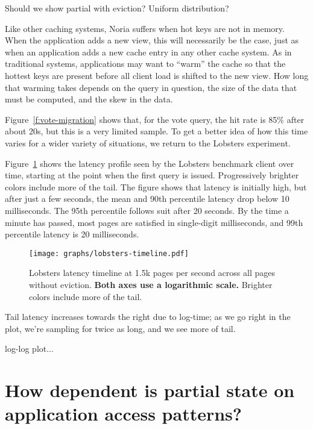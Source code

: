 \begin{inprogress}
  Should we show partial with eviction?
  Uniform distribution?
\end{inprogress}

Like other caching systems, Noria suffers when hot keys are not in memory. When
the application adds a new view, this will necessarily be the case, just as when
an application adds a new cache entry in any other cache system. As in
traditional systems, applications may want to ``warm'' the cache so that the
hottest keys are present before all client load is shifted to the new view. How
long that warming takes depends on the query in question, the size of the data
that must be computed, and the skew in the data.

Figure~\ref{f:vote-migration} shows that, for the vote query, the hit rate is
85\% after about 20s, but this is a very limited sample. To get a better idea of
how this time varies for a wider variety of situations, we return to the
Lobsters experiment.

Figure~\ref{f:lobsters-timeline} shows the latency profile seen by the Lobsters
benchmark client over time, starting at the point when the first query is
issued. Progressively brighter colors include more of the tail. The figure
shows that latency is initially high, but after just a few seconds, the mean and
90th percentile latency drop below 10 milliseconds. The 95th percentile follows
suit after 20 seconds. By the time a minute has passed, most pages are satisfied
in single-digit milliseconds, and 99th percentile latency is 20 milliseconds.

\begin{figure}[t]
  \centering
  \texttt{[image: graphs/lobsters-timeline.pdf]}
  \caption{Lobsters latency timeline at 1.5k pages per second across all pages
  without eviction. \textbf{Both axes use a logarithmic scale.} Brighter colors
  include more of the tail.}
  \label{f:lobsters-timeline}
\end{figure}

\begin{inprogress}
  Tail latency increases towards the right due to log-time; as we go right in
  the plot, we're sampling for twice as long, and we see more of tail.
\end{inprogress}

\begin{inprogress}
  log-log plot...
\end{inprogress}

\section{How dependent is partial state on application access patterns?}
\label{s:eval:patterns}

